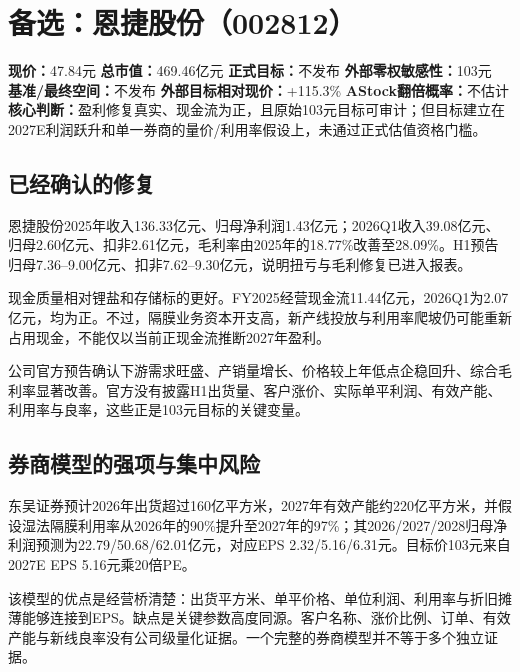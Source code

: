 \chapter{备选：恩捷股份（002812）}

\begin{dashboardbox}[结论卡]
\textbf{现价：}47.84元 \quad \textbf{总市值：}469.46亿元 \quad \textbf{正式目标：}不发布 \quad \textbf{外部零权敏感性：}103元 \\
\textbf{基准/最终空间：}不发布 \quad \textbf{外部目标相对现价：}+115.3\% \quad \textbf{AStock翻倍概率：}不估计 \\
\textbf{核心判断：}盈利修复真实、现金流为正，且原始103元目标可审计；但目标建立在2027E利润跃升和单一券商的量价/利用率假设上，未通过正式估值资格门槛。
\end{dashboardbox}

\section{已经确认的修复}

恩捷股份2025年收入136.33亿元、归母净利润1.43亿元；2026Q1收入39.08亿元、归母2.60亿元、扣非2.61亿元，毛利率由2025年的18.77\%改善至28.09\%。H1预告归母7.36--9.00亿元、扣非7.62--9.30亿元，说明扭亏与毛利修复已进入报表。

现金质量相对锂盐和存储标的更好。FY2025经营现金流11.44亿元，2026Q1为2.07亿元，均为正。不过，隔膜业务资本开支高，新产线投放与利用率爬坡仍可能重新占用现金，不能仅以当前正现金流推断2027年盈利。

公司官方预告确认下游需求旺盛、产销量增长、价格较上年低点企稳回升、综合毛利率显著改善。官方没有披露H1出货量、客户涨价、实际单平利润、有效产能、利用率与良率，这些正是103元目标的关键变量。

\section{券商模型的强项与集中风险}

东吴证券预计2026年出货超过160亿平方米，2027年有效产能约220亿平方米，并假设湿法隔膜利用率从2026年的90\%提升至2027年的97\%；其2026/2027/2028归母净利润预测为22.79/50.68/62.01亿元，对应EPS 2.32/5.16/6.31元。目标价103元来自2027E EPS 5.16元乘20倍PE。

该模型的优点是经营桥清楚：出货平方米、单平价格、单位利润、利用率与折旧摊薄能够连接到EPS。缺点是关键参数高度同源。客户名称、涨价比例、订单、有效产能与新线良率没有公司级量化证据。一个完整的券商模型并不等于多个独立证据。


